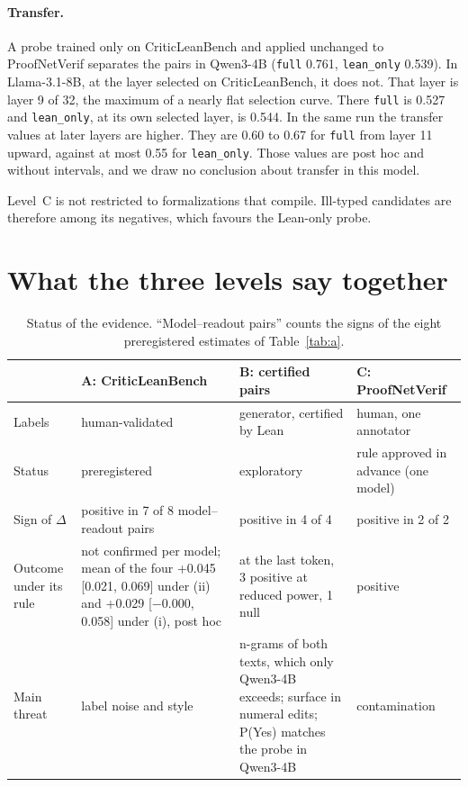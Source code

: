 \documentclass[10pt]{article}
\newcommand{\vr}[1]{\texttt{#1}}
\newcommand{\D}{\Delta}
\begin{document}
\paragraph{Transfer.}
A probe trained only on CriticLeanBench and applied unchanged to ProofNetVerif separates the pairs in Qwen3-4B
(\vr{full} 0.761, \vr{lean\_only} 0.539). In Llama-3.1-8B, at the layer selected on CriticLeanBench, it does not.
That layer is layer 9 of 32, the maximum of a nearly flat selection curve. There \vr{full} is 0.527 and
\vr{lean\_only}, at its own selected layer, is 0.544. In the same run the transfer values at later layers are
higher. They are 0.60 to 0.67 for \vr{full} from layer 11 upward, against at most 0.55 for \vr{lean\_only}. Those
values are post hoc and without intervals, and we draw no conclusion about transfer in this model.

Level~C is not restricted to formalizations that compile. Ill-typed candidates are therefore among its negatives,
which favours the Lean-only probe.

\section{What the three levels say together}

\begin{table}[h]
\centering
\caption{Status of the evidence. ``Model--readout pairs'' counts the signs of the eight preregistered estimates of Table~\ref{tab:a}.}
\label{tab:conjunta}
\vspace{2pt}
\begin{tabularx}{\linewidth}{@{}lXXX@{}}
\toprule
 & A: CriticLeanBench & B: certified pairs & C: ProofNetVerif\\
\midrule
Labels & human-validated & generator, certified by Lean & human, one annotator\\
Status & preregistered & exploratory & rule approved in advance (one model)\\
Sign of $\D$ & positive in 7 of 8 model--readout pairs & positive in 4 of 4 & positive in 2 of 2\\
Outcome under its rule & not confirmed per model; mean of the four +0.045 [0.021, 0.069] under (ii) and +0.029 [−0.000, 0.058] under (i), post hoc & at the last token, 3 positive at reduced power, 1 null & positive\\
Main threat & label noise and style & n-grams of both texts, which only Qwen3-4B exceeds; surface in numeral edits; P(Yes) matches the probe in Qwen3-4B & contamination\\
\bottomrule
\end{tabularx}
\end{table}
\end{document}
